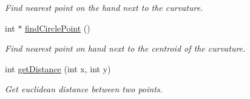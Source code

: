 \begin{DoxyCompactItemize}
\begin{DoxyCompactList}\small\item\em Find nearest point on the hand next to the curvature. \end{DoxyCompactList}\item 
int $\ast$ \hyperlink{structcurve_a9c28c74ac0f9ce59290079125ff65a5d}{find\+Circle\+Point} ()
\begin{DoxyCompactList}\small\item\em Find nearest point on hand next to the centroid of the curvature. \end{DoxyCompactList}\item 
int \hyperlink{structcurve_af270a465ea41efcb89b930490aaf8d20}{get\+Distance} (int x, int y)
\begin{DoxyCompactList}\small\item\em Get euclidean distance between two points. \end{DoxyCompactList}\end{DoxyCompactItemize}
